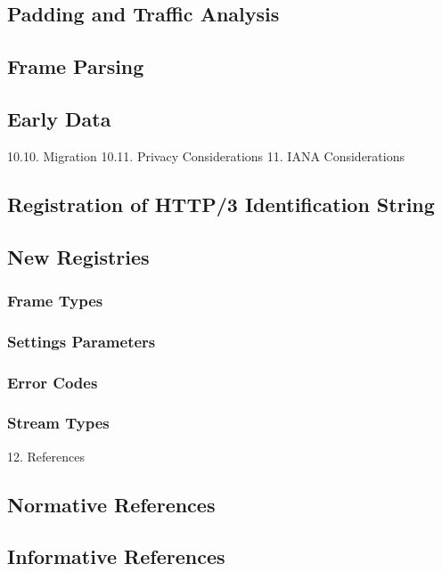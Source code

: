 \documentclass{article}
\begin{document}
\subsection{Padding and Traffic Analysis}

\subsection{Frame Parsing}

\subsection{Early Data}

10.10. Migration 10.11. Privacy Considerations 11. IANA Considerations

\subsection{Registration of HTTP/3 Identification String}

\subsection{New Registries}

\subsubsection{Frame Types}

\subsubsection{Settings Parameters}

\subsubsection{Error Codes}

\subsubsection{Stream Types}

12. References

\subsection{Normative References}

\subsection{Informative References}
\end{document}
